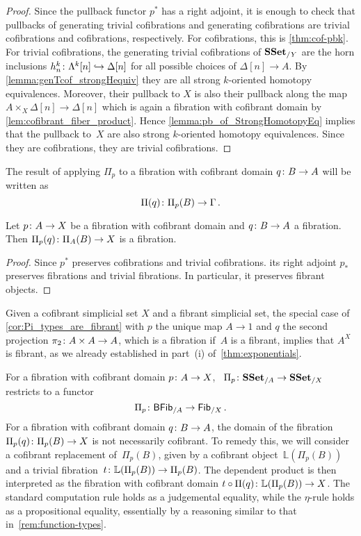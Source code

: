 \documentclass[reqno,10pt,a4paper,oneside,draft]{amsart}
\begin{document}
\begin{proof} Since the pullback functor $p^*$ has a right adjoint,  it is enough to check that pullbacks of generating trivial cofibrations and generating cofibrations are trivial cofibrations and cofibrations, respectively. For cofibrations, this is \cref{thm:cof-pbk}. For trivial cofibrations, the generating trivial cofibrations of $\mathbf{SSet}_{/Y}$ are the horn inclusions $h^k_n \colon \Lambda^{k}[n] \hookrightarrow \Delta[n]$ for all possible choices of $\Delta[n] \rightarrow A$. By \cref{lemma:genTcof_strongHequiv} they are all strong $k$-oriented homotopy equivalences. Moreover, their pullback to $X$ is also their pullback along the map $A \times_X \Delta[n] \rightarrow \Delta[n]$ which is again a fibration with cofibrant domain by \cref{lem:cofibrant_fiber_product}. Hence  \cref{lemma:pb_of_StrongHomotopyEq} implies that the pullback 
to~$X$ are also strong $k$-oriented homotopy equivalences. Since they are cofibrations, they are trivial cofibrations.
\end{proof}

The result of applying $\Pi_p$ to a fibration with cofibrant domain $q \colon B \to A$ will be written as 
\[
\Pi(q) \colon \Pi_p(B) \to \Gamma \, .
\] 

\begin{corollary}\label{cor:Pi_types_are_fibrant}
Let $p \colon A \rightarrow X$ be a fibration with cofibrant domain and $q \colon B \rightarrow A$ a fibration. Then $\Pi_p(q) \colon \Pi_A(B) \rightarrow X$ is a fibration.
\end{corollary}

\begin{proof}
Since $p^*$ preserves cofibrations and trivial cofibrations. its right adjoint $p_*$ preserves fibrations and trivial fibrations. In particular, it preserves fibrant objects.
\end{proof}


Given a cofibrant simplicial set $X$ and a fibrant simplicial set, the special case of \cref{cor:Pi_types_are_fibrant} with $p$   the unique map $A \to 1$ and $q$ the second projection 
$\pi_2 \colon A \times A \to A$, which is a fibration if~$A$ is a  fibrant, implies that $A^X$ is fibrant, as we already established in part~(i) 
of~\cref{thm:exponentials}. 



\begin{remark} For a fibration with cofibrant domain $p \colon A \to X$, ~$\Pi_p \colon \mathbf{SSet}_{/A} \to \mathbf{SSet}_{/X}$ restricts to a functor
\[
\Pi_p \colon \mathsf{BFib}_{/A}  \to \mathsf{Fib}_{/X} \, .
\]
For a fibration with cofibrant domain $q \colon B \to A$, the domain of the fibration $\Pi_p(q) \colon 
\Pi_p(B) \to X$ is not necessarily cofibrant. To remedy this, we will consider a cofibrant replacement 
of~$\Pi_p(B)$, given by a cofibrant object~$\mathbb{L}(\Pi_p(B))$ and a trivial fibration~$t \colon \mathbb{L}(\Pi_p(B)) \to \Pi_p(B)$. The dependent product is then interpreted as the fibration with cofibrant domain $t \circ \Pi(q) \colon  \mathbb{L}(\Pi_p(B)) \to X$. The standard
computation rule holds as a judgemental equality, while the $\eta$-rule holds as a propositional equality,
essentially by a reasoning similar to that in~\cref{rem:function-types}. 
\end{remark}
\end{document}
